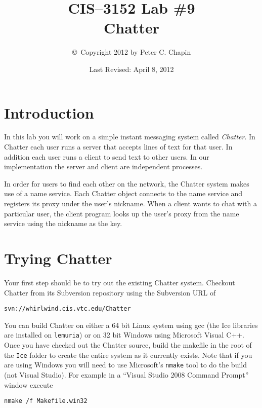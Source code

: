 \documentclass[twocolumn]{article}
\begin{document}
\title{CIS--3152 Lab \#9\\Chatter}
\author{\copyright\ Copyright 2012 by Peter C. Chapin}
\date{Last Revised: April 8, 2012}
\maketitle

\section*{Introduction}

In this lab you will work on a simple instant messaging system called \textit{Chatter}. In
Chatter each user runs a server that accepts lines of text for that user. In addition each user
runs a client to send text to other users. In our implementation the server and client are
independent processes.

In order for users to find each other on the network, the Chatter system makes use of a name
service. Each Chatter object connects to the name service and registers its proxy under the
user's nickname. When a client wants to chat with a particular user, the client program looks up
the user's proxy from the name service using the nickname as the key.

\section{Trying Chatter}

Your first step should be to try out the existing Chatter system. Checkout Chatter from its
Subversion repository using the Subversion URL of
\begin{verbatim}
svn://whirlwind.cis.vtc.edu/Chatter
\end{verbatim}

You can build Chatter on either a 64 bit Linux system using gcc (the Ice libraries are installed
on \texttt{lemuria}) or on 32 bit Windows using Microsoft Visual C++. Once you have checked out
the Chatter source, build the makefile in the root of the \texttt{Ice} folder to create the
entire system as it currently exists. Note that if you are using Windows you will need to use
Microsoft's \texttt{nmake} tool to do the build (not Visual Studio). For example in a ``Visual
Studio 2008 Command Prompt'' window execute
\begin{verbatim}
nmake /f Makefile.win32
\end{verbatim}
\end{document}
